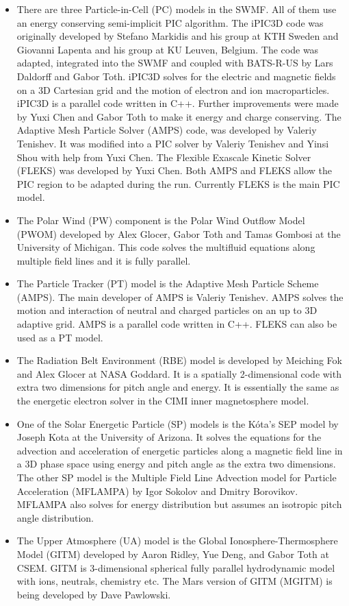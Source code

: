 \begin{itemize}
\item
There are three Particle-in-Cell (PC) models in the SWMF. 
All of them use an energy conserving semi-implicit PIC algorithm.
The iPIC3D code was originally developed by Stefano Markidis and
his group at KTH Sweden
and Giovanni Lapenta and his group at KU Leuven, Belgium.
The code was adapted, integrated into the SWMF and coupled
with BATS-R-US by Lars Daldorff and Gabor Toth. 
iPIC3D solves for the electric and magnetic fields on 
a 3D Cartesian grid and the motion of electron and ion
macroparticles. iPIC3D is a parallel code written in C++. 
Further improvements were made by Yuxi Chen and Gabor Toth 
to make it energy and charge conserving.
The Adaptive Mesh Particle Solver (AMPS) code, was developed by 
Valeriy Tenishev. It was modified into a PIC solver by Valeriy Tenishev
and Yinsi Shou with help from Yuxi Chen. The Flexible Exascale Kinetic
Solver (FLEKS) was developed by Yuxi Chen. Both AMPS and FLEKS allow
the PIC region to be adapted during the run. Currently FLEKS is the main
PIC model.

\item
The Polar Wind (PW) component is the Polar Wind Outflow Model (PWOM)
developed by Alex Glocer, Gabor Toth and Tamas Gombosi
at the University of Michigan.  This code solves the
multifluid equations along multiple field lines and it is fully parallel.

\item
The Particle Tracker (PT) model is the Adaptive Mesh Particle Scheme (AMPS).
The main developer of AMPS is Valeriy Tenishev. AMPS solves the motion
and interaction of neutral and charged particles on an up to 3D 
adaptive grid. AMPS is a parallel code written in C++.
FLEKS can also be used as a PT model.

\item
The Radiation Belt Environment (RBE) model is developed by Meiching Fok
and Alex Glocer at NASA Goddard. It is a spatially 2-dimensional code with 
extra two dimensions for pitch angle and energy. It is essentially the
same as the energetic electron solver in the CIMI inner magnetosphere model.

\item
One of the Solar Energetic Particle (SP) models is the
K\'ota's SEP model by Joseph Kota at the University of Arizona.
It solves the equations for the advection and acceleration of
energetic particles along a magnetic field line in a 3D phase space
using energy and pitch angle as the extra two dimensions.
The other SP model is the Multiple Field Line Advection model for 
Particle Acceleration (MFLAMPA) by Igor Sokolov and Dmitry Borovikov. 
MFLAMPA also solves
for energy distribution but assumes an isotropic pitch angle distribution.

\item
The Upper Atmosphere (UA) model is the 
Global Ionosphere-Thermosphere Model (GITM) 
developed by Aaron Ridley, Yue Deng, and Gabor Toth at CSEM.
GITM is 3-dimensional spherical
fully parallel hydrodynamic model with ions, neutrals, chemistry etc.
The Mars version of GITM (MGITM) is being developed by Dave Pawlowski.

\end{itemize}
